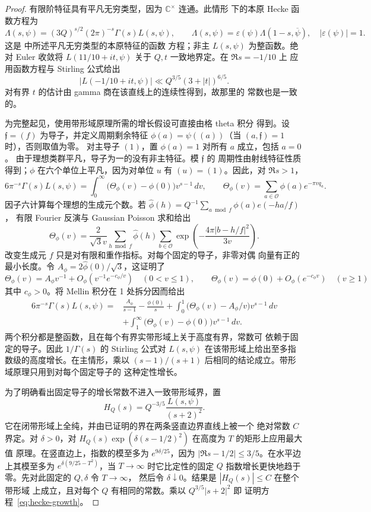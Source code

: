 \begin{proof}
有限阶特征具有平凡无穷类型，因为 $\mathbb C^\times$ 连通。此情形
下的本原 Hecke 函数方程为
\[
 \Lambda(s,\psi)=(3Q)^{s/2}(2\pi)^{-s}\Gamma(s)L(s,\psi),\qquad
 \Lambda(s,\psi)=\varepsilon(\psi)\Lambda(1-s,\overline\psi),
 \quad |\varepsilon(\psi)|=1.
\]
这是 \cite[方程 (1.1)]{GZ} 中所述平凡无穷类型的本原特征的函数
方程；非主 $L(s,\psi)$ 为整函数。绝对 Euler 收敛将
$L(11/10+it,\psi)$ 关于 $Q,t$ 一致地界定。在 $\Re s=-1/10$ 上
应用函数方程与 Stirling 公式给出
\[
 |L(-1/10+it,\psi)|\ll Q^{3/5}(3+|t|)^{6/5}.
\]
对有界 $t$ 的估计由 gamma 商在该直线上的连续性得到，故那里的
常数也是一致的。

为完整起见，使用带形域原理所需的增长假设可直接由格 theta 积分
得到。设 $\mathfrak f=(f)$ 为导子，并定义周期剩余特征
$\phi(a)=\psi((a))$（当 $(a,\mathfrak f)=1$ 时），否则取值为零。
对主导子 $(1)$，置 $\phi(a)=1$ 对所有 $a$ 成立，包括 $a=0$。
由于理想类群平凡，导子为一的没有非主特征。模 $\mathfrak f$ 的
周期性由射线特征性质得到；$\phi$ 在六个单位上平凡，因为对单位
$u$ 有 $(u)=(1)$。因此，对 $\Re s>1$，
\[
 6\pi^{-s}\Gamma(s)L(s,\psi)
 =\int_0^\infty\bigl(\Theta_\phi(v)-\phi(0)\bigr)v^{s-1}\,dv,
 \qquad
 \Theta_\phi(v)=\sum_{a\in\mathcal O}\phi(a)e^{-\pi vq_a}.
\]
因子六计算每个理想的生成元个数。若
$\widehat\phi(h)=Q^{-1}\sum_{a\bmod f}\phi(a)e(-ha/f)$，
有限 Fourier 反演与 Gaussian Poisson 求和给出
\[
 \Theta_\phi(v)=\frac{2}{\sqrt3v}
 \sum_{h\bmod f}\widehat\phi(h)
 \sum_{b\in\mathcal O}
    \exp\left(-\frac{4\pi|b-h/f|^2}{3v}\right).
\]
改变生成元 $f$ 只是对有限和重作指标。对每个固定的导子，非零对偶
向量有正的最小长度。令 $A_\phi=2\widehat\phi(0)/\sqrt3$，这证明了
\[
 \Theta_\phi(v)=A_\phi v^{-1}+O_\phi(v^{-1}e^{-c_\phi/v})\quad(0<v\le1),
 \qquad
 \Theta_\phi(v)=\phi(0)+O_\phi(e^{-c_\phi v})\quad(v\ge1)
\]
其中 $c_\phi>0$。将 Mellin 积分在 1 处拆分因而给出
\[
 \begin{split}
 6\pi^{-s}\Gamma(s)L(s,\psi)
 ={}&\frac{A_\phi}{s-1}-\frac{\phi(0)}s
 +\int_0^1\bigl(\Theta_\phi(v)-A_\phi/v\bigr)v^{s-1}\,dv\\
 &+\int_1^\infty\bigl(\Theta_\phi(v)-\phi(0)\bigr)v^{s-1}\,dv.
 \end{split}
\]
两个积分都是整函数，且在每个有界实带形域上关于高度有界，常数可
依赖于固定的导子。因此 $1/\Gamma(s)$ 的 Stirling 公式对
$L(s,\psi)$ 在该带形域上给出至多指数级的高度增长。在主情形，乘以
$(s-1)/(s+1)$ 后相同的结论成立。带形域原理只用到对每个固定导子的
这种定性增长。

为了明确看出固定导子的增长常数不进入一致带形域界，置
\[
 H_Q(s)=Q^{-3/5}\frac{L(s,\psi)}{(s+2)^2}.
\]
它在闭带形域上全纯，并由已证明的界在两条竖直边界直线上被一个
绝对常数 $C$ 界定。对 $\delta>0$，对
$H_Q(s)\exp(\delta(s-1/2)^2)$ 在高度为 $T$ 的矩形上应用最大值
原理。在竖直边上，指数的模至多为 $e^{9\delta/25}$，因为
$|\Re s-1/2|\le3/5$。在水平边上其模至多为
$e^{\delta(9/25-T^2)}$，当 $T\to\infty$ 时它比定性的固定 $Q$
指数增长更快地趋于零。先对此固定的 $Q,\delta$ 令 $T\to\infty$，
然后令 $\delta\downarrow0$。结果是 $|H_Q(s)|\le C$ 在整个带形域
上成立，且对每个 $Q$ 有相同的常数。乘以 $Q^{3/5}|s+2|^2$ 即
证明方程~\eqref{eq:hecke-growth}。


\end{proof}

